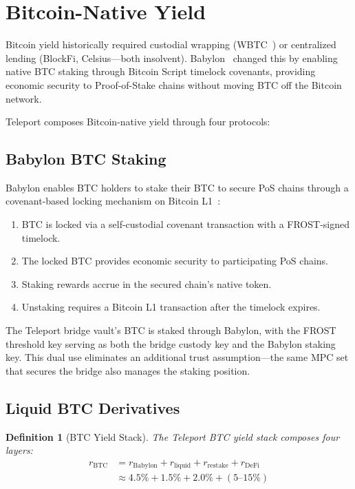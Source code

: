\documentclass[11pt,twocolumn]{article}
\newtheorem{definition}{Definition}[section]
\begin{document}
\section{Bitcoin-Native Yield}\label{sec:btc}

Bitcoin yield historically required custodial wrapping (WBTC~\cite{wbtc}) or centralized lending (BlockFi, Celsius---both insolvent). Babylon~\cite{babylon2024} changed this by enabling native BTC staking through Bitcoin Script timelock covenants, providing economic security to Proof-of-Stake chains without moving BTC off the Bitcoin network.

Teleport composes Bitcoin-native yield through four protocols:

\subsection{Babylon BTC Staking}

Babylon enables BTC holders to stake their BTC to secure PoS chains through a covenant-based locking mechanism on Bitcoin L1~\cite{babylon2024}:

\begin{enumerate}[nosep]
  \item BTC is locked via a self-custodial covenant transaction with a FROST-signed timelock.
  \item The locked BTC provides economic security to participating PoS chains.
  \item Staking rewards accrue in the secured chain's native token.
  \item Unstaking requires a Bitcoin L1 transaction after the timelock expires.
\end{enumerate}

The Teleport bridge vault's BTC is staked through Babylon, with the FROST threshold key serving as both the bridge custody key and the Babylon staking key. This dual use eliminates an additional trust assumption---the same MPC set that secures the bridge also manages the staking position.

\subsection{Liquid BTC Derivatives}

\begin{definition}[BTC Yield Stack]
The Teleport BTC yield stack composes four layers:
\begin{align}
  r_{\text{BTC}} &= r_{\text{Babylon}} + r_{\text{liquid}} + r_{\text{restake}} + r_{\text{DeFi}} \label{eq:btc_yield}\\[4pt]
  &\approx 4.5\% + 1.5\% + 2.0\% + (5\text{--}15\%) \nonumber
\end{align}
\end{definition}
\end{document}
